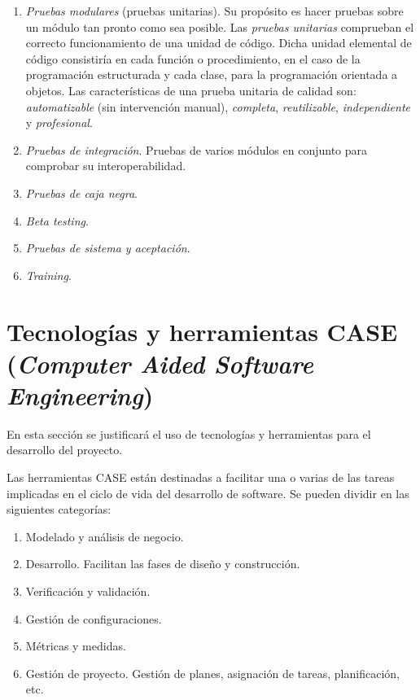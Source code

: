 \begin{enumerate}
\item \emph{Pruebas modulares} (pruebas unitarias). Su propósito es hacer pruebas sobre un módulo tan pronto como sea posible. Las \emph{pruebas unitarias} comprueban el correcto funcionamiento de una unidad de código. Dicha unidad elemental de código consistiría en cada función o procedimiento, en el caso de la programación estructurada y cada clase, para la programación orientada a objetos. Las características de una prueba unitaria de calidad son: \emph{automatizable} (sin intervención manual), \emph{completa},  \emph{reutilizable}, \emph{independiente} y \emph{profesional}.

\item \emph{Pruebas de integración}. Pruebas de varios módulos en conjunto para comprobar su interoperabilidad.

\item \emph{Pruebas de caja negra}.

\item \emph{Beta testing}.

\item \emph{Pruebas de sistema y aceptación}.

\item \emph{Training}.
\end{enumerate}






\section[Tecnologías]{Tecnologías y herramientas CASE (\emph{Computer Aided Software Engineering})}
En esta sección se justificará el uso de tecnologías y herramientas para el desarrollo del proyecto.

Las herramientas CASE están destinadas a facilitar una o varias de las tareas implicadas en el ciclo de vida del desarrollo de software. Se pueden dividir en las siguientes categorías:

\begin{enumerate}
\item Modelado y análisis de negocio.
\item Desarrollo. Facilitan las fases de diseño y construcción.
\item Verificación y validación.
\item Gestión de configuraciones.
\item Métricas y medidas.
\item Gestión de proyecto. Gestión de planes, asignación de tareas, planificación, etc.
\end{enumerate}



